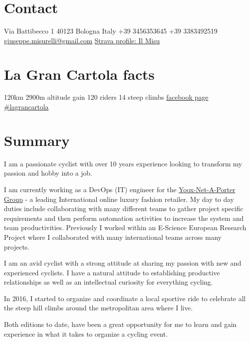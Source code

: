 \documentclass[]{friggeri-cv}
\begin{document}

\begin{aside}
  \section{Contact}
    Via Battibecco 1
    40123 Bologna
    Italy
    +39 3456353645
    +39 3383492519
    ~
    \href{mailto:giuseppe.misurelli@gmail.com}{giuseppe.misurelli@gmail.com}
    \href{https://www.strava.com/athletes/1932399}{Strava profile: Il Misu}
  \section{La Gran Cartola facts}
    120km
    2900m altitude gain
    120 riders
    14 steep climbs
    \href{https://www.facebook.com/lagrancartola/}{facebook page}
    \href{https://www.instagram.com/lagrancartola/}{\#lagrancartola}
\end{aside}

\section{Summary}

I am a passionate cyclist with over 10 years experience looking to transform my passion and hobby into a job.\par
I am currently working as a DevOps (IT) engineer for the \href{http://www.ynap.com/}{\underline{Yoox-Net-A-Porter Group}} - a leading International online luxury fashion retailer.
My day to day duties include collaborating with many different teams to gather project specific requirements and then perform automation activities to increase the system and team productivities.
Previously I worked within an E-Science European Research Project where I collaborated with many international teams across many projects.\par

I am an avid cyclist with a strong attitude at sharing my passion with new and experienced cyclists.
I have a natural attitude to establishing productive relationships as well as an intellectual curiosity for everything cycling.\par

In 2016, I started to organize and coordinate a local sportive ride to celebrate all the steep hill climbs around the metropolitan area where I live.\par
Both editions to date, have been a great opportunity for me to learn and gain experience in what it takes to organize a cycling event.
\end{document}
